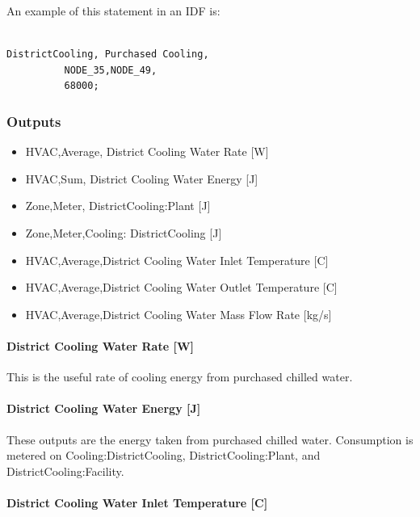 An example of this statement in an IDF is:

\begin{lstlisting}

DistrictCooling, Purchased Cooling,
          NODE_35,NODE_49,
          68000;
\end{lstlisting}

\subsubsection{Outputs}\label{outputs-14-003}

\begin{itemize}
    \item
    HVAC,Average, District Cooling Water Rate {[}W{]}
    \item
    HVAC,Sum, District Cooling Water Energy {[}J{]}
    \item
    Zone,Meter, DistrictCooling:Plant {[}J{]}
    \item
    Zone,Meter,Cooling: DistrictCooling {[}J{]}
    \item
    HVAC,Average,District Cooling Water Inlet Temperature {[}C{]}
    \item
    HVAC,Average,District Cooling Water Outlet Temperature {[}C{]}
    \item
    HVAC,Average,District Cooling Water Mass Flow Rate {[}kg/s{]}
\end{itemize}

\paragraph{District Cooling Water Rate {[}W{]}}\label{district-cooling-chilled-water-rate-w}

This is the useful rate of cooling energy from purchased chilled water. 

\paragraph{District Cooling Water Energy {[}J{]}}\label{district-cooling-chilled-water-energy-j}

These outputs are the energy taken from purchased chilled water. Consumption is metered on Cooling:DistrictCooling, DistrictCooling:Plant, and DistrictCooling:Facility.

\paragraph{District Cooling Water Inlet Temperature {[}C{]}}\label{district-cooling-inlet-temperature-c}

